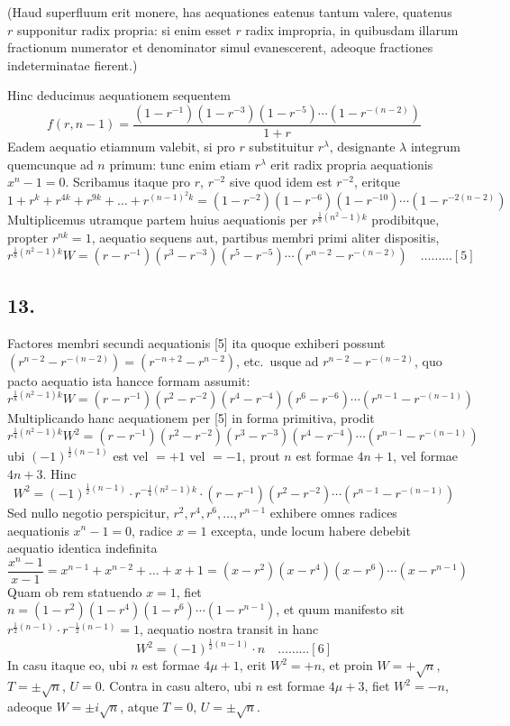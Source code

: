 \documentclass[12pt,a4paper]{article}
\theoremstyle{plain}
\begin{document}
(Haud superfluum erit monere, has aequationes eatenus tantum valere, quatenus $r$ supponitur radix propria: si enim esset $r$ radix impropria, in quibusdam illarum fractionum numerator et denominator simul evanescerent, adeoque fractiones indeterminatae fierent.)

Hinc deducimus aequationem sequentem
\[
f(r, n-1) = \frac{(1-r^{-1})(1-r^{-3})(1-r^{-5}) \cdots (1-r^{-(n-2)})}{1+r}
\]
Eadem aequatio etiamnum valebit, si pro $r$ substituitur $r^{\lambda}$, designante $\lambda$ integrum quemcunque ad $n$ primum: tunc enim etiam $r^{\lambda}$ erit radix propria aequationis $x^n - 1 = 0$. Scribamus itaque pro $r$, $r^{-2}$ sive quod idem est $r^{-2}$, eritque
\[
1 + r^{k} + r^{4k} + r^{9k} + \ldots + r^{(n-1)^2 k} = (1-r^{-2})(1-r^{-6})(1-r^{-10}) \cdots (1-r^{-2(n-2)})
\]
Multiplicemus utramque partem huius aequationis per $r^{\frac{1}{8}(n^2-1)k}$ prodibitque, propter $r^{nk} = 1$, aequatio sequens aut, partibus membri primi aliter dispositis,
\[
r^{\frac{1}{8}(n^2-1)k} W = (r-r^{-1})(r^3-r^{-3})(r^5-r^{-5}) \cdots (r^{n-2}-r^{-(n-2)}) \quad \ldots \ldots \ldots [5]
\]

\subsection*{13.}

Factores membri secundi aequationis [5] ita quoque exhiberi possunt $(r^{n-2}-r^{-(n-2)}) = (r^{-n+2}-r^{n-2})$, etc.\ usque ad $r^{n-2}-r^{-(n-2)}$, quo pacto aequatio ista hancce formam assumit:
\[
r^{\frac{1}{8}(n^2-1)k} W = (r-r^{-1})(r^2-r^{-2})(r^4-r^{-4})(r^6-r^{-6}) \cdots (r^{n-1}-r^{-(n-1)})
\]
Multiplicando hanc aequationem per [5] in forma primitiva, prodit
\[
r^{\frac{1}{4}(n^2-1)k} W^2 = (r-r^{-1})(r^2-r^{-2})(r^3-r^{-3})(r^4-r^{-4}) \cdots (r^{n-1}-r^{-(n-1)})
\]
ubi $(-1)^{\frac{1}{2}(n-1)}$ est vel $= +1$ vel $= -1$, prout $n$ est formae $4n+1$, vel formae $4n+3$. Hinc
\[
W^2 = (-1)^{\frac{1}{2}(n-1)} \cdot r^{-\frac{1}{4}(n^2-1)k} \cdot (r-r^{-1})(r^2-r^{-2}) \cdots (r^{n-1}-r^{-(n-1)})
\]
Sed nullo negotio perspicitur, $r^2, r^4, r^6, \ldots, r^{n-1}$ exhibere omnes radices aequationis $x^n - 1 = 0$, radice $x = 1$ excepta, unde locum habere debebit aequatio identica indefinita
\[
\frac{x^n - 1}{x - 1} = x^{n-1} + x^{n-2} + \ldots + x + 1 = (x-r^2)(x-r^4)(x-r^6) \cdots (x-r^{n-1})
\]
Quam ob rem statuendo $x = 1$, fiet $n = (1-r^2)(1-r^4)(1-r^6) \cdots (1-r^{n-1})$, et quum manifesto sit $r^{\frac{1}{2}(n-1)} \cdot r^{-\frac{1}{2}(n-1)} = 1$, aequatio nostra transit in hanc
\[
W^2 = (-1)^{\frac{1}{2}(n-1)} \cdot n \quad \ldots \ldots \ldots [6]
\]
In casu itaque eo, ubi $n$ est formae $4\mu+1$, erit $W^2 = +n$, et proin $W = +\sqrt{n}$, $T = \pm\sqrt{n}$, $U = 0$. Contra in casu altero, ubi $n$ est formae $4\mu+3$, fiet $W^2 = -n$, adeoque $W = \pm i\sqrt{n}$, atque $T = 0$, $U = \pm\sqrt{n}$.
\end{document}
